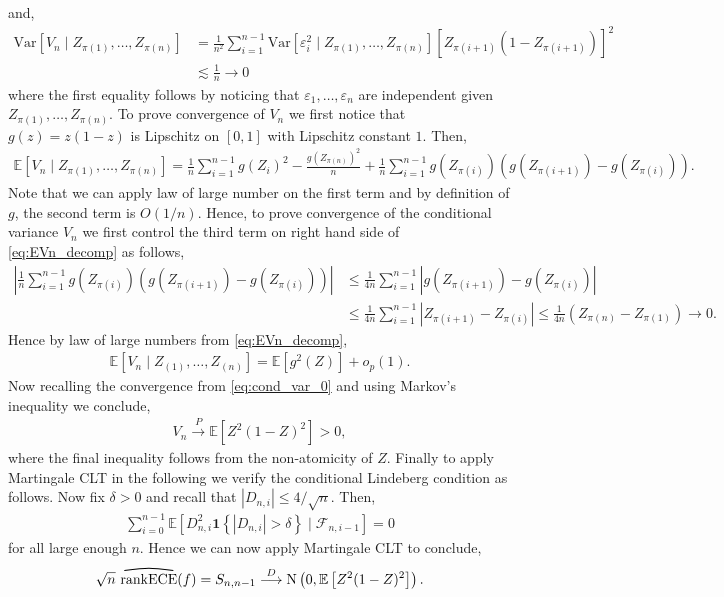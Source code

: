 \documentclass[11pt]{article}
\numberwithin{equation}{section}
\theoremstyle{definition}
\newcommand{\E}{\mathbb{E}}
\newcommand{\cF}{\mathcal{F}}
\newcommand{\one}{\bm{1}}
\newcommand{\ra}{\rightarrow}
\newcommand{\vep}{\varepsilon}
\newcommand{\pto}{\overset{P}{\longrightarrow}}
\newcommand{\dto}{\overset{D}{\longrightarrow}}
\newcommand{\myoverline}[2][3.5em]{%
  \overset{%
    \tikz[baseline=-0.1ex]{
      \draw[line width=0.75pt]
        (0,0) .. controls (#1/2,0.5ex) .. (#1,0);
    }%
  }{#2}%
}
\newcommand{\Var}{\mathrm{Var}}
\newcommand{\rankECE}{\mathrm{rankECE}}
\newcommand{\hatrankECE}{\myoverline{\rankECE}}
\begin{document}
and,
\begin{align}\label{eq:cond_var_0}
    \Var\left[V_n\mid Z_{\pi(1)},\ldots, Z_{\pi(n)}\right] 
    & = \frac{1}{n^2}\sum_{i=1}^{n-1}\Var\left[\vep_{i}^2\mid Z_{\pi(1)},\ldots, Z_{\pi(n)}\right]\left[Z_{\pi(i+1)}(1-Z_{\pi(i+1)})\right]^2\nonumber\\
    &\lesssim \frac{1}{n}\ra 0
\end{align}
where the first equality follows by noticing that $\vep_1,\ldots, \vep_n$ are independent given $Z_{\pi(1)},\ldots, Z_{\pi(n)}$. To prove convergence of $V_n$ we first notice that $g(z) = z(1-z)$ is Lipschitz on $[0,1]$ with Lipschitz constant $1$. Then,
\begin{align}\label{eq:EVn_decomp}
    \E\left[V_n\mid Z_{\pi(1)},\ldots, Z_{\pi(n)}\right] = \frac{1}{n}\sum_{i=1}^{n-1}g(Z_i)^2 - \frac{g(Z_{\pi(n)})^2}{n} + \frac{1}{n}\sum_{i=1}^{n-1}g(Z_{\pi(i)})\left(g\left(Z_{\pi(i+1)}\right) - g\left(Z_{\pi(i)}\right)\right).
\end{align}
Note that we can apply law of large number on the first term and by definition of $g$, the second term is $O(1/n)$. Hence, to prove convergence of the conditional variance $V_n$ we first control the third term on right hand side of \eqref{eq:EVn_decomp} as follows,
\begin{align*}
    \left|\frac{1}{n}\sum_{i=1}^{n-1}g(Z_{\pi(i)})\left(g\left(Z_{\pi(i+1)}\right) - g\left(Z_{\pi(i)}\right)\right)\right|
    &\leq \frac{1}{4n}\sum_{i=1}^{n-1}\left|g\left(Z_{\pi(i+1)}\right) - g\left(Z_{\pi(i)}\right)\right|\\
    &\leq \frac{1}{4n}\sum_{i=1}^{n-1}\left|Z_{\pi(i+1)} - Z_{\pi(i)}\right|
    \leq \frac{1}{4n}\left(Z_{\pi(n)} - Z_{\pi(1)}\right)\ra 0.
\end{align*}
Hence by law of large numbers from \eqref{eq:EVn_decomp},
\begin{align*}
    \E\left[V_n\mid Z_{(1)},\ldots, Z_{(n)}\right] = \E\left[g^2(Z)\right] + o_p(1).
\end{align*}
Now recalling the convergence from \eqref{eq:cond_var_0} and using Markov's inequality we conclude,
\begin{align}\label{eq:cond_var_convg}
    V_n\pto \E\left[Z^2(1-Z)^2\right]>0,
\end{align}
where the final inequality follows from the non-atomicity of $Z$. Finally to apply Martingale CLT in the following we verify the conditional Lindeberg condition as follows. Now fix $\delta>0$ and recall that $|D_{n,i}|\leq 4/\sqrt{n}$. Then,
\begin{align}\label{eq:cond_lind}
    \sum_{i=0}^{n-1}\E\left[D_{n,i}^2\one\left\{|D_{n,i}|>\delta\right\}\mid \cF_{n,i-1}\right] = 0
\end{align}
for all large enough $n$. Hence we can now apply Martingale CLT \citep{hall2014martingale} to conclude,
\begin{align*}
    \sqrt{n}\ \hatrankECE(f) = S_{n,n-1}\dto\mathrm{N}\left(0, \E\left[Z^2(1-Z)^2\right]\right).
\end{align*}
\end{document}
